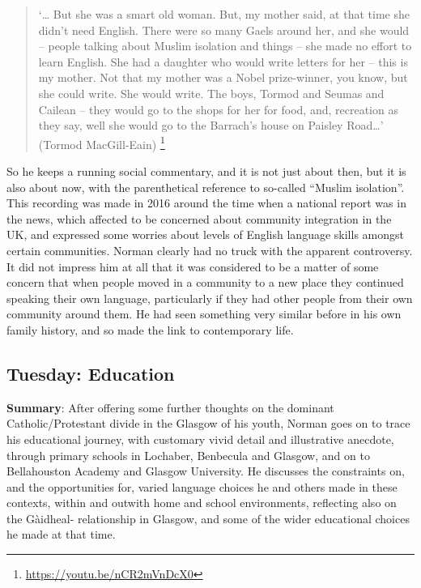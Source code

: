 \documentclass[output=paper,colorlinks,citecolor=brown]{langscibook}
\begin{document}
\begin{quote}
`… But she was a smart old woman. But, my mother said, at that time she didn’t need English. There were so many Gaels around her, and she would – people talking about Muslim isolation and things – she made no effort to learn English. She had a daughter who would write letters for her – this is my mother. Not that my mother was a Nobel prize-winner, you know, but she could write. She would write. The boys, Tormod and Seumas and Cailean – they would go to the shops for her for food, and, recreation as they say, well she would go to the Barrach’s house on Paisley Road…' (Tormod MacGill-Eain) \footnote{\url{https://youtu.be/nCR2mVnDcX0}} 
\end{quote}


So he keeps a running social commentary, and it is not just about then, but it is also about now, with the parenthetical reference to so-called ``Muslim isolation”. This recording was made in 2016 around the time when a national report \citep{gw:Casey2016} 
was in the news, which affected to be concerned about community integration in the UK, and expressed some worries about levels of English language skills amongst certain communities. Norman clearly had no truck with the apparent controversy. It did not impress him at all that it was considered to be a matter of some concern that when people moved in a community to a new place they continued speaking their own language, particularly if they had other people from their own community around them. He had seen something very similar before in his own family history, and so made the link to contemporary life.

\subsection{Tuesday: Education}

\textbf{Summary}: After offering some further thoughts on the dominant Catholic/Pro\-tes\-tant divide in the Glasgow of his youth, Norman goes on to trace his educational journey, with customary vivid detail and illustrative anecdote, through primary schools in Lochaber, Benbecula and Glasgow, and on to Bellahouston Academy and Glasgow University. He discusses the constraints on, and the opportunities for, varied language choices he and others made in these contexts, within and outwith home and school environments, reflecting also on the Gàidh\-eal- relationship in Glasgow, and some of the wider educational choices he made at that time.
\end{document}
